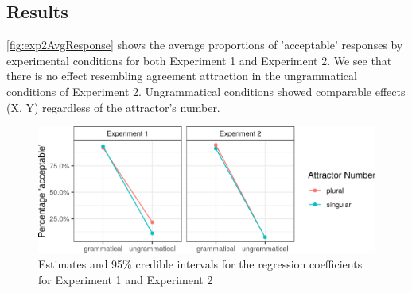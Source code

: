 \documentclass[a4paper,man,natbib]{apa6}\usepackage[]{graphicx}\usepackage[]{color}
\begin{document}

\subsection{Results} \label{sec:exp2:results}

\autoref{fig:exp2AvgResponse} shows the average proportions of 'acceptable' responses by experimental conditions for both Experiment 1 and Experiment 2. We see that there is no effect resembling agreement attraction in the ungrammatical conditions of Experiment 2. Ungrammatical conditions showed comparable effects (X, Y) regardless of the attractor's number.  
\begin{figure}[h]
\centering
\includegraphics[width=\textwidth]{figures/exp2AvgResponse-1.png}
\caption{Estimates and 95\% credible intervals for the regression coefficients for Experiment 1 and Experiment 2}
\label{fig:exp2AvgResponse}
\end{figure}
\end{document}
